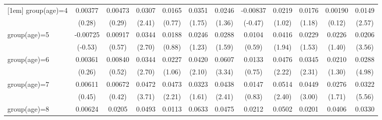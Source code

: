 \begin{table}[htbp]
\begin{tabular}{l*{11}{c}}
[1em]
group(age)=4        &     0.00377         &     0.00473         &      0.0307\sym{*}  &      0.0165         &      0.0351         &      0.0246         &    -0.00837         &      0.0219         &      0.0176         &     0.00190         &      0.0149\sym{*}  \\
                    &      (0.28)         &      (0.29)         &      (2.41)         &      (0.77)         &      (1.75)         &      (1.36)         &     (-0.47)         &      (1.02)         &      (1.18)         &      (0.12)         &      (2.57)         \\
[1em]
group(age)=5        &    -0.00725         &     0.00917         &      0.0344\sym{**} &      0.0188         &      0.0246         &      0.0288         &      0.0104         &      0.0416         &      0.0229         &      0.0226         &      0.0206\sym{***}\\
                    &     (-0.53)         &      (0.57)         &      (2.70)         &      (0.88)         &      (1.23)         &      (1.59)         &      (0.59)         &      (1.94)         &      (1.53)         &      (1.40)         &      (3.56)         \\
[1em]
group(age)=6        &     0.00361         &     0.00840         &      0.0344\sym{**} &      0.0227         &      0.0420\sym{*}  &      0.0607\sym{**} &      0.0133         &      0.0476\sym{*}  &      0.0345\sym{*}  &      0.0210         &      0.0288\sym{***}\\
                    &      (0.26)         &      (0.52)         &      (2.70)         &      (1.06)         &      (2.10)         &      (3.34)         &      (0.75)         &      (2.22)         &      (2.31)         &      (1.30)         &      (4.98)         \\
[1em]
group(age)=7        &     0.00611         &     0.00672         &      0.0472\sym{***}&      0.0473\sym{*}  &      0.0323         &      0.0438\sym{*}  &      0.0147         &      0.0514\sym{*}  &      0.0449\sym{**} &      0.0276         &      0.0322\sym{***}\\
                    &      (0.45)         &      (0.42)         &      (3.71)         &      (2.21)         &      (1.61)         &      (2.41)         &      (0.83)         &      (2.40)         &      (3.00)         &      (1.71)         &      (5.56)         \\
[1em]
group(age)=8        &     0.00624         &      0.0205         &      0.0493\sym{***}&      0.0113         &      0.0633\sym{**} &      0.0475\sym{*}  &      0.0212         &      0.0502\sym{*}  &      0.0201         &      0.0406\sym{*}  &      0.0330\sym{***}\\

\end{tabular}
\end{table}
